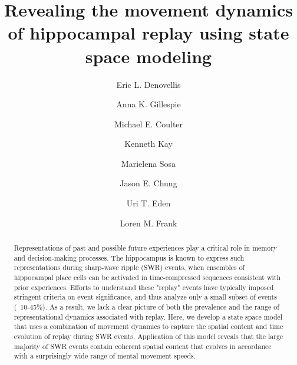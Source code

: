 \documentclass[times, twoside]{zHenriquesLab-StyleBioRxiv}
\begin{document}
\title{Revealing the movement dynamics of hippocampal replay using state space modeling}

\author[1]{Eric L. Denovellis}
\author[2, 3]{Anna K. Gillespie}
\author[2, 3]{Michael E. Coulter}
\author[4]{Kenneth Kay}
\author[5]{Marielena Sosa}
\author[6]{Jason E. Chung}
\author[7]{Uri T. Eden}
\author[1, 2, 3, \Letter]{Loren M. Frank}




\maketitle

\begin{abstract}
Representations of past and possible future experiences play a critical role in memory and decision-making processes. The hippocampus is known to express such representations during sharp-wave ripple (SWR) events, when ensembles of hippocampal place cells can be activated in time-compressed sequences consistent with prior experiences. Efforts to understand these "replay" events have typically imposed stringent criteria on event significance, and thus analyze only a small subset of events (~10-45\%). As a result, we lack a clear picture of both the prevalence and the range of representational dynamics associated with replay. Here, we develop a state space model that uses a combination of movement dynamics to capture the spatial content and time evolution of replay during SWR events. Application of this model reveals that the large majority of SWR events contain coherent spatial content that evolves in accordance with a surprisingly wide range of mental movement speeds.

\end {abstract}
\end{document}
